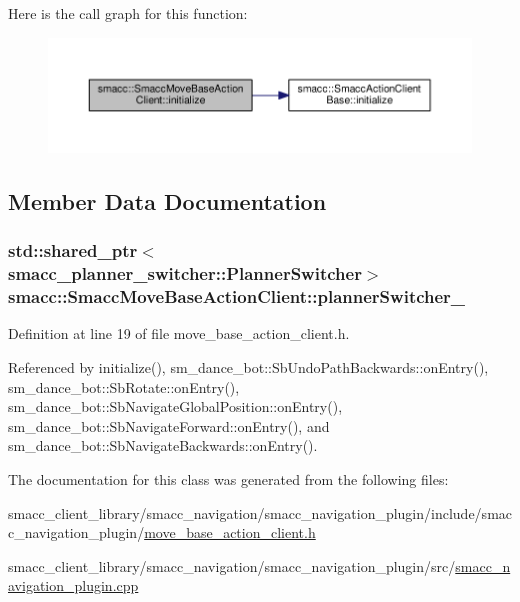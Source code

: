 Here is the call graph for this function\+:
\nopagebreak
\begin{figure}[H]
\begin{center}
\leavevmode
\includegraphics[width=350pt]{classsmacc_1_1SmaccMoveBaseActionClient_ae520045638a5f722ad1367f6d705b7c4_cgraph}
\end{center}
\end{figure}




\subsection{Member Data Documentation}
\subsubsection[{\texorpdfstring{planner\+Switcher\+\_\+}{plannerSwitcher_}}]{\setlength{\rightskip}{0pt plus 5cm}std\+::shared\+\_\+ptr$<${\bf smacc\+\_\+planner\+\_\+switcher\+::\+Planner\+Switcher}$>$ smacc\+::\+Smacc\+Move\+Base\+Action\+Client\+::planner\+Switcher\+\_\+}\hypertarget{classsmacc_1_1SmaccMoveBaseActionClient_ae24164268108abf0b35cf51bfba5ec67}{}\label{classsmacc_1_1SmaccMoveBaseActionClient_ae24164268108abf0b35cf51bfba5ec67}


Definition at line 19 of file move\+\_\+base\+\_\+action\+\_\+client.\+h.



Referenced by initialize(), sm\+\_\+dance\+\_\+bot\+::\+Sb\+Undo\+Path\+Backwards\+::on\+Entry(), sm\+\_\+dance\+\_\+bot\+::\+Sb\+Rotate\+::on\+Entry(), sm\+\_\+dance\+\_\+bot\+::\+Sb\+Navigate\+Global\+Position\+::on\+Entry(), sm\+\_\+dance\+\_\+bot\+::\+Sb\+Navigate\+Forward\+::on\+Entry(), and sm\+\_\+dance\+\_\+bot\+::\+Sb\+Navigate\+Backwards\+::on\+Entry().



The documentation for this class was generated from the following files\+:\begin{DoxyCompactItemize}
\item 
smacc\+\_\+client\+\_\+library/smacc\+\_\+navigation/smacc\+\_\+navigation\+\_\+plugin/include/smacc\+\_\+navigation\+\_\+plugin/\hyperlink{move__base__action__client_8h}{move\+\_\+base\+\_\+action\+\_\+client.\+h}\item 
smacc\+\_\+client\+\_\+library/smacc\+\_\+navigation/smacc\+\_\+navigation\+\_\+plugin/src/\hyperlink{smacc__navigation__plugin_8cpp}{smacc\+\_\+navigation\+\_\+plugin.\+cpp}\end{DoxyCompactItemize}
